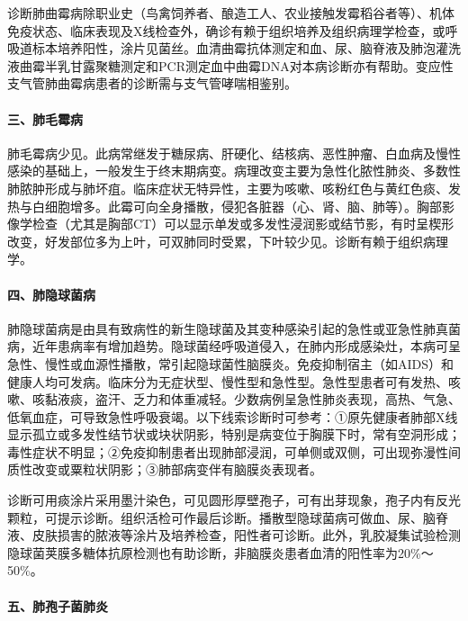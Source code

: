 诊断肺曲霉病除职业史（鸟禽饲养者、酿造工人、农业接触发霉稻谷者等）、机体免疫状态、临床表现及X线检查外，确诊有赖于组织培养及组织病理学检查，或呼吸道标本培养阳性，涂片见菌丝。血清曲霉抗体测定和血、尿、脑脊液及肺泡灌洗液曲霉半乳甘露聚糖测定和PCR测定血中曲霉DNA对本病诊断亦有帮助。变应性支气管肺曲霉病患者的诊断需与支气管哮喘相鉴别。

\paragraph{三、肺毛霉病}

肺毛霉病少见。此病常继发于糖尿病、肝硬化、结核病、恶性肿瘤、白血病及慢性感染的基础上，一般发生于终末期病变。病理改变主要为急性化脓性肺炎、多数性肺脓肿形成与肺坏疽。临床症状无特异性，主要为咳嗽、咳粉红色与黄红色痰、发热与白细胞增多。此霉可向全身播散，侵犯各脏器（心、肾、脑、肺等）。胸部影像学检查（尤其是胸部CT）可以显示单发或多发性浸润影或结节影，有时呈楔形改变，好发部位多为上叶，可双肺同时受累，下叶较少见。诊断有赖于组织病理学。

\paragraph{四、肺隐球菌病}

肺隐球菌病是由具有致病性的新生隐球菌及其变种感染引起的急性或亚急性肺真菌病，近年患病率有增加趋势。隐球菌经呼吸道侵入，在肺内形成感染灶，本病可呈急性、慢性或血源性播散，常引起隐球菌性脑膜炎。免疫抑制宿主（如AIDS）和健康人均可发病。临床分为无症状型、慢性型和急性型。急性型患者可有发热、咳嗽、咳黏液痰，盗汗、乏力和体重减轻。少数病例呈急性肺炎表现，高热、气急、低氧血症，可导致急性呼吸衰竭。以下线索诊断时可参考：①原先健康者肺部X线显示孤立或多发性结节状或块状阴影，特别是病变位于胸膜下时，常有空洞形成；毒性症状不明显；②免疫抑制患者出现肺部浸润，可单侧或双侧，可出现弥漫性间质性改变或粟粒状阴影；③肺部病变伴有脑膜炎表现者。

诊断可用痰涂片采用墨汁染色，可见圆形厚壁孢子，可有出芽现象，孢子内有反光颗粒，可提示诊断。组织活检可作最后诊断。播散型隐球菌病可做血、尿、脑脊液、皮肤损害的脓液等涂片及培养检查，阳性者可诊断。此外，乳胶凝集试验检测隐球菌荚膜多糖体抗原检测也有助诊断，非脑膜炎患者血清的阳性率为20\%～50\%。

\paragraph{五、肺孢子菌肺炎}

